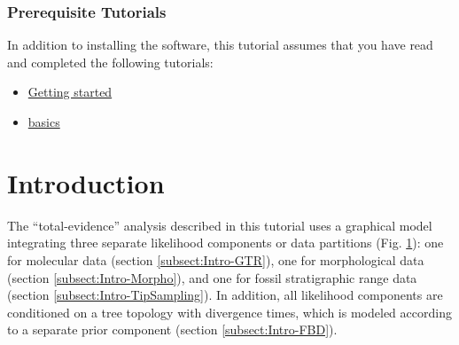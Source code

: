 \subsubsection{Prerequisite Tutorials}
In addition to installing the software, this tutorial assumes that you have read and completed the following tutorials:
\begin{itemize}[noitemsep,topsep=0pt]
\item \href{https://github.com/revbayes/revbayes_tutorial/raw/master/tutorial_TeX/RB_Getting_Started/RB_Getting_Started.pdf}{Getting started}
\item \href{https://github.com/revbayes/revbayes_tutorial/raw/master/tutorial_TeX/RB_Basics_Tutorial/RB_Basics_Tutorial.pdf}{\Rev basics}
\end{itemize}


\bigskip
\section{Introduction}\label{sect:Introduction}

The ``total-evidence'' analysis described in this tutorial uses a graphical model \citep{Hoehna2014b} integrating three separate likelihood components or data partitions (Fig. \ref{fig:module-gm}): one for molecular data (section \ref{subsect:Intro-GTR}), one for morphological data (section \ref{subsect:Intro-Morpho}), and one for fossil stratigraphic range data (section \ref{subsect:Intro-TipSampling}). In addition, all likelihood components are conditioned on a tree topology with divergence times, which is modeled according to a separate prior component (section \ref{subsect:Intro-FBD}).
\begin{figure}[h!]
\label{fig:module-gm}
\end{figure}

